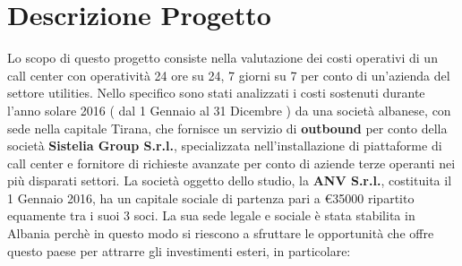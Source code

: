 \chapter{Descrizione Progetto}
\renewcommand{\thesection}{\arabic{section}}
Lo scopo di questo progetto consiste nella valutazione dei costi operativi di un call center con operatività 24 ore su 24, 7 giorni su 7 per conto di un'azienda del settore utilities. \newline
Nello specifico sono stati analizzati i costi sostenuti durante l'anno solare 2016 ( dal 1 Gennaio al 31 Dicembre ) da una società albanese, con sede nella capitale Tirana, che fornisce un servizio di \textbf{outbound} per conto della società \textbf{Sistelia Group S.r.l.}, specializzata nell'installazione di piattaforme di call center e fornitore di richieste avanzate per conto di aziende terze operanti nei più disparati settori. \newline
La società oggetto dello studio, la \textbf{\ac{ANV S.r.l.}}, costituita il 1 Gennaio 2016, ha un capitale sociale di partenza pari a \euro 35000 ripartito equamente tra i suoi 3 soci. La sua sede legale e sociale è stata stabilita in Albania perchè in questo modo si riescono a sfruttare le opportunità che offre questo paese per attrarre gli investimenti esteri, in particolare:
